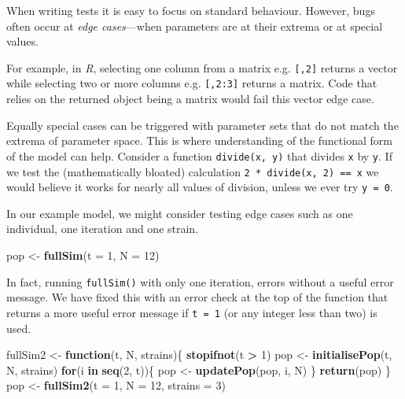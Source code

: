 \documentclass[10pt,letterpaper]{article}
\newenvironment{Shaded}{\begin{snugshade}}{\end{snugshade}}
\newcommand{\ControlFlowTok}[1]{\textcolor[rgb]{0.13,0.29,0.53}{\textbf{#1}}}
\newcommand{\DataTypeTok}[1]{\textcolor[rgb]{0.13,0.29,0.53}{#1}}
\newcommand{\DecValTok}[1]{\textcolor[rgb]{0.00,0.00,0.81}{#1}}
\newcommand{\KeywordTok}[1]{\textcolor[rgb]{0.13,0.29,0.53}{\textbf{#1}}}
\newcommand{\NormalTok}[1]{#1}
\newcommand{\OperatorTok}[1]{\textcolor[rgb]{0.81,0.36,0.00}{\textbf{#1}}}
\newcommand{\StringTok}[1]{\textcolor[rgb]{0.31,0.60,0.02}{#1}}
\begin{document}
When writing tests it is easy to focus on standard behaviour.
However, bugs often occur at \emph{edge cases}---when parameters are at their extrema or at special values.

For example, in \emph{R}, selecting one column from a matrix e.g. \texttt{{[},2{]}} returns a vector while selecting two or more columns e.g. \texttt{{[},2:3{]}} returns a matrix.
Code that relies on the returned object being a matrix would fail this vector edge case.

Equally special cases can be triggered with parameter sets that do not match the extrema of parameter space.
This is where understanding of the functional form of the model can help. Consider a function \texttt{divide(x,\ y)} that divides \texttt{x} by \texttt{y}.
If we test the (mathematically bloated) calculation \texttt{2\ *\ divide(x,\ 2)\ ==\ x} we would believe it works for nearly all values of division, unless we ever try \texttt{y\ =\ 0}.

In our example model, we might consider testing edge cases such as one individual, one iteration and one strain.

\begin{Shaded}
\begin{Highlighting}[]
\NormalTok{pop <-}\StringTok{ }\KeywordTok{fullSim}\NormalTok{(}\DataTypeTok{t =} \DecValTok{1}\NormalTok{, }\DataTypeTok{N =} \DecValTok{12}\NormalTok{)}
\end{Highlighting}
\end{Shaded}

In fact, running \texttt{fullSim()} with only one iteration, errors without a useful error message.
We have fixed this with an error check at the top of the function that returns a more useful error message if \texttt{t\ =\ 1} (or any integer less than two) is used.
\newline
{}\label{erroronspecialcase}

\begin{Shaded}
\begin{Highlighting}[]
\NormalTok{fullSim2 <-}\StringTok{ }\ControlFlowTok{function}\NormalTok{(t, N, strains)\{}
  \KeywordTok{stopifnot}\NormalTok{(t }\OperatorTok{>}\StringTok{ }\DecValTok{1}\NormalTok{)}
\NormalTok{  pop <-}\StringTok{ }\KeywordTok{initialisePop}\NormalTok{(t, N, strains) }
  \ControlFlowTok{for}\NormalTok{(i }\ControlFlowTok{in} \KeywordTok{seq}\NormalTok{(}\DecValTok{2}\NormalTok{, t))\{}
\NormalTok{    pop <-}\StringTok{ }\KeywordTok{updatePop}\NormalTok{(pop, i, N)}
\NormalTok{  \}}
  \KeywordTok{return}\NormalTok{(pop)}
\NormalTok{\}}
\NormalTok{pop <-}\StringTok{ }\KeywordTok{fullSim2}\NormalTok{(}\DataTypeTok{t =} \DecValTok{1}\NormalTok{, }\DataTypeTok{N =} \DecValTok{12}\NormalTok{, }\DataTypeTok{strains =} \DecValTok{3}\NormalTok{)}
\end{Highlighting}
\end{Shaded}
\end{document}

